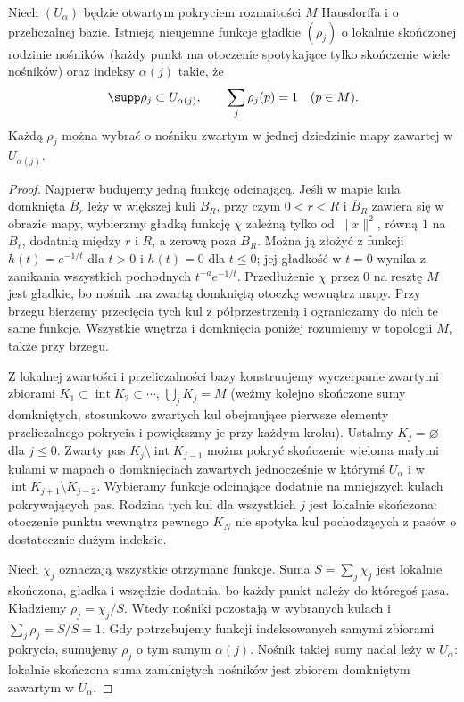 \begin{twierdzenie}
\label{thm:podzial-jednosci-formy}
Niech $(U_\alpha)$ będzie otwartym pokryciem rozmaitości
$M$ Hausdorffa i o przeliczalnej bazie. Istnieją
nieujemne funkcje gładkie $(\rho_j)$ o lokalnie skończonej
rodzinie nośników (każdy punkt ma otoczenie spotykające
tylko skończenie wiele nośników) oraz indeksy $\alpha(j)$ takie, że
\[
 \supp\rho_j\subset U_{\alpha(j)},
 \qquad \sum_j\rho_j(p)=1\quad(p\in M).
\]
Każdą $\rho_j$ można wybrać o nośniku zwartym
w jednej dziedzinie mapy zawartej w $U_{\alpha(j)}$.
\end{twierdzenie}
\begin{proof}
Najpierw budujemy jedną funkcję odcinającą.
Jeśli w mapie kula domknięta $\overline B_r$
leży w większej kuli $B_R$, przy czym $0<r<R$
i $\overline B_R$ zawiera się w obrazie mapy,
wybierzmy gładką funkcję $\chi$ zależną tylko
od $\|x\|^2$, równą $1$ na $\overline B_r$,
dodatnią między $r$ i $R$, a zerową poza $B_R$.
Można ją złożyć z funkcji $h(t)=e^{-1/t}$ dla
$t>0$ i $h(t)=0$ dla $t\leq0$; jej gładkość w
$t=0$ wynika z zanikania wszystkich pochodnych
$t^{-a}e^{-1/t}$. Przedłużenie $\chi$ przez $0$
na resztę $M$ jest gładkie, bo nośnik ma zwartą
domkniętą otoczkę wewnątrz mapy. Przy brzegu bierzemy
przecięcia tych kul z półprzestrzenią i ograniczamy do nich
te same funkcje. Wszystkie wnętrza i domknięcia poniżej
rozumiemy w topologii $M$, także przy brzegu.

Z lokalnej zwartości i przeliczalności bazy
konstruujemy wyczerpanie zwartymi zbiorami
$K_1\subset\operatorname{int}K_2\subset\cdots$,
$\bigcup_jK_j=M$ (weźmy kolejno skończone
sumy domkniętych, stosunkowo zwartych kul
obejmujące pierwsze elementy przeliczalnego
pokrycia i powiększmy je przy każdym kroku).
Ustalmy $K_j=\varnothing$ dla $j\leq0$.
Zwarty pas $K_j\setminus\operatorname{int}K_{j-1}$
można pokryć skończenie wieloma małymi kulami
w mapach o domknięciach zawartych jednocześnie
w którymś $U_\alpha$ i w
$\operatorname{int}K_{j+1}\setminus K_{j-2}$.
Wybieramy funkcje odcinające dodatnie na
mniejszych kulach pokrywających pas.
Rodzina tych kul dla wszystkich $j$ jest
lokalnie skończona: otoczenie punktu wewnątrz
pewnego $K_N$ nie spotyka kul pochodzących
z pasów o dostatecznie dużym indeksie.

Niech $\chi_j$ oznaczają wszystkie otrzymane
funkcje. Suma $S=\sum_j\chi_j$ jest lokalnie
skończona, gładka i wszędzie dodatnia, bo
każdy punkt należy do któregoś pasa. Kładziemy
$\rho_j=\chi_j/S$. Wtedy nośniki pozostają
w wybranych kulach i
$\sum_j\rho_j=S/S=1$.
Gdy potrzebujemy funkcji indeksowanych samymi zbiorami
pokrycia, sumujemy $\rho_j$ o tym samym $\alpha(j)$.
Nośnik takiej sumy nadal leży w $U_\alpha$:
lokalnie skończona suma zamkniętych nośników jest
zbiorem domkniętym zawartym w $U_\alpha$.
\end{proof}
